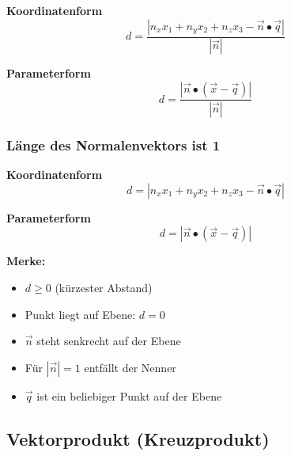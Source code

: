 \begin{minipage}[t]{0.6\columnwidth}
    \centering\textbf{Koordinatenform}
    \vspace{-0.1cm}
    \[
    d = \frac{|n_x x_1+n_y x_2+n_z x_3-\vec{n}\bullet\vec{q}|}
    {|\vec{n}|}
    \]
\end{minipage}
\hfill
\begin{minipage}[t]{0.38\columnwidth}
    \centering\textbf{Parameterform}
    \vspace{-0.1cm}
    \[
    d = \frac{|\vec{n}\bullet(\vec{x}-\vec{q})|}
    {|\vec{n}|}
    \]
\end{minipage}
\vspace{0.2cm}

\subsubsection{Länge des Normalenvektors ist 1}

\begin{minipage}[t]{0.6\columnwidth}
    \centering\textbf{Koordinatenform}
    \vspace{-0.1cm}
    \[
    d = |n_x x_1+n_y x_2+n_z x_3-\vec{n}\bullet\vec{q}|
    \]
\end{minipage}
\hfill
\begin{minipage}[t]{0.38\columnwidth}
    \centering\textbf{Parameterform}
    \vspace{-0.1cm}
    \[
    d = |\vec{n}\bullet(\vec{x}-\vec{q})|
    \]
\end{minipage}
\vspace{0.5cm}

\textbf{Merke:}
\begin{itemize}
    \item $d \geq 0$ (kürzester Abstand)
    \item Punkt liegt auf Ebene: $d = 0$
    \item $\vec{n}$ steht senkrecht auf der Ebene
    \item Für $|\vec{n}| = 1$ entfällt der Nenner
    \item $\vec{q}$ ist ein beliebiger Punkt auf der Ebene
\end{itemize}
\pagebreak


\subsection{Vektorprodukt (Kreuzprodukt)}	

